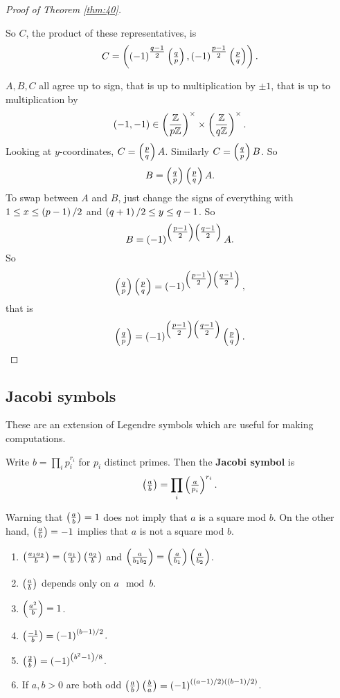 \begin{proof}[Proof of Theorem \ref{thm:40}]
\begin{itemize}
So $ C $, the product of these representatives, is
$$ C = \left( \left( -1 \right)^{\tfrac{q - 1}{2}}\left( \tfrac{q}{p} \right), \left( -1 \right)^{\tfrac{p - 1}{2}}\left( \tfrac{p}{q} \right) \right). $$
\end{itemize}
$ A, B, C $ all agree up to sign, that is up to multiplication by $ \pm 1 $, that is up to multiplication by
$$ \left( -1, -1 \right) \in \left( \dfrac{\mathbb{Z}}{p\mathbb{Z}} \right)^\times \times \left( \dfrac{\mathbb{Z}}{q\mathbb{Z}} \right)^\times. $$
Looking at $ y $-coordinates, $ C = \left( \tfrac{p}{q} \right)A $. Similarly $ C = \left( \tfrac{q}{p} \right)B $. So
$$ B = \left( \tfrac{q}{p} \right)\left( \tfrac{p}{q} \right)A. $$
To swap between $ A $ and $ B $, just change the signs of everything with $ 1 \le x \le \left( p - 1 \right) / 2 $ and $ \left( q + 1 \right) / 2 \le y \le q - 1 $. So
$$ B = \left( -1 \right)^{\left( \tfrac{p - 1}{2} \right)\left( \tfrac{q - 1}{2} \right)}A. $$
So
$$ \left( \tfrac{q}{p} \right)\left( \tfrac{p}{q} \right) = \left( -1 \right)^{\left( \tfrac{p - 1}{2} \right)\left( \tfrac{q - 1}{2} \right)}, $$
that is
$$ \left( \tfrac{q}{p} \right) = \left( -1 \right)^{\left( \tfrac{p - 1}{2} \right)\left( \tfrac{q - 1}{2} \right)}\left( \tfrac{p}{q} \right). $$
\end{proof}

\subsection{Jacobi symbols}

These are an extension of Legendre symbols which are useful for making computations.

\begin{definition}
Write $ b = \prod_i p_i^{r_i} $ for $ p_i $ distinct primes. Then the \textbf{Jacobi symbol} is
$$ \left( \tfrac{a}{b} \right) = \prod_i \left( \tfrac{a}{p_i} \right)^{r_i}. $$
\end{definition}

Warning that $ \left( \tfrac{a}{b} \right) = 1 $ does not imply that $ a $ is a square mod $ b $. On the other hand, $ \left( \tfrac{a}{b} \right) = -1 $ implies that $ a $ is not a square mod $ b $.


\begin{lemma}
\hfill
\begin{enumerate}
\item $ \left( \tfrac{a_1a_2}{b} \right) = \left( \tfrac{a_1}{b} \right)\left( \tfrac{a_2}{b} \right) $ and $ \left( \tfrac{a}{b_1b_2} \right) = \left( \tfrac{a}{b_1} \right)\left( \tfrac{a}{b_2} \right) $.
\item $ \left( \tfrac{a}{b} \right) $ depends only on $ a \mod b $.
\item $ \left( \tfrac{a^2}{b} \right) = 1 $.
\item $ \left( \tfrac{-1}{b} \right) = \left( -1 \right)^{\left( b - 1 \right) / 2} $.
\item $ \left( \tfrac{2}{b} \right) = \left( -1 \right)^{\left( b^2 - 1 \right) / 8} $.
\item If $ a, b > 0 $ are both odd $ \left( \tfrac{a}{b} \right)\left( \tfrac{b}{a} \right) = \left( -1 \right)^{\left( \left( a - 1 \right) / 2 \right)\left( \left( b - 1 \right) / 2 \right)} $.
\end{enumerate}
\end{lemma}


